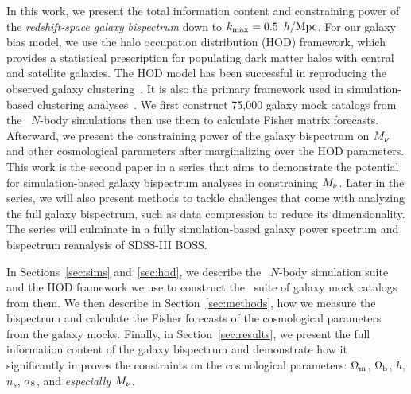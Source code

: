 In this work, we present the total information content and constraining power
of the {\em redshift-space galaxy bispectrum} down to $k_{\rm max}= 0.5~\,h/\mathrm{Mpc}$. For our galaxy
bias model, we use the halo occupation distribution (HOD) framework, which provides a
statistical prescription for populating dark matter halos with central and satellite
galaxies. The HOD model has been successful in reproducing the observed galaxy
clustering~\citep[\emph{e.g.}][]{zheng2005, leauthaud2012, tinker2013, zentner2016, vakili2019}. 
It is also the primary framework used in simulation-based clustering
analyses~\citep[\eg][]{mcclintock2018, zhai2019, lange2019, wibking2019}. 
We first construct 75,000 galaxy mock catalogs from the \quij~$N$-body
simulations then use them to calculate Fisher matrix forecasts. Afterward, we
present the constraining power of the galaxy bispectrum on $M_\nu$ and other 
cosmological parameters after marginalizing over the HOD parameters. This work
is the second paper in a series that aims to demonstrate the potential for
simulation-based galaxy bispectrum analyses in constraining $M_\nu$. Later in
the series, we will also present methods to tackle challenges that come with
analyzing the full galaxy bispectrum, such as data compression to reduce its
dimensionality. The series will culminate in a fully simulation-based galaxy
power spectrum and bispectrum reanalysis of SDSS-III BOSS. 

In Sections~\ref{sec:sims} and~\ref{sec:hod}, we describe the \quij~$N$-body simulation 
suite and the HOD framework we use to construct the \molino~suite of galaxy mock 
catalogs from them.  We then describe in Section~\ref{sec:methods}, how we measure the bispectrum and
calculate the Fisher forecasts of the cosmological parameters from the galaxy
mocks. Finally, in Section~\ref{sec:results}, we present the full information
content of the galaxy bispectrum and demonstrate how it significantly improves
the constraints on the cosmological parameters: $\Omega_{\rm m}$, $\Omega_{\rm b}$, $h$, $n_s$,
$\sigma_8$, and {\em especially} $M_\nu$. 
